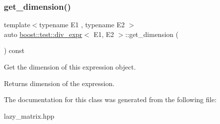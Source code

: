 \subsubsection{\texorpdfstring{get\_dimension()}{get\_dimension()}}
{\footnotesize\ttfamily template$<$typename E1 , typename E2 $>$ \\
auto \mbox{\hyperlink{classboost_1_1test_1_1div__expr}{boost\+::test\+::div\+\_\+expr}}$<$ E1, E2 $>$\+::get\+\_\+dimension (\begin{DoxyParamCaption}{ }\end{DoxyParamCaption}) const\hspace{0.3cm}{\ttfamily [inline]}}



Get the dimension of this expression object. 

\begin{DoxyReturn}{Returns}
dimension of the expression. 
\end{DoxyReturn}


The documentation for this class was generated from the following file\+:\begin{DoxyCompactItemize}
\item 
lazy\+\_\+matrix.\+hpp\end{DoxyCompactItemize}
